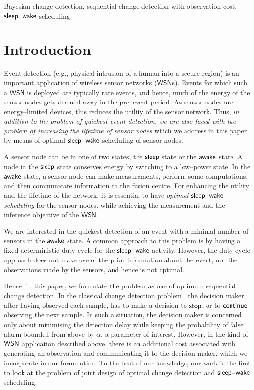 \documentclass[journal]{IEEEtran}
\newcommand{\sleep}{{${\sf sleep }$}}
\newcommand{\wake}{{${\sf awake }$}}
\newcommand{\wsn}{$\mathsf{WSN}$}
\begin{document}
\begin{IEEEkeywords}
Bayesian change detection, sequential change detection with observation
cost, \sleep--${\sf wake}$ scheduling 
\end{IEEEkeywords}


\IEEEpeerreviewmaketitle


\section{Introduction}
\label{sec:introduction}
Event detection (e.g., physical intrusion of a human into a secure
region) is an important application of wireless sensor networks
({\wsn}s). Events for which such a {\wsn} is deployed are typically rare
events, and hence, much of the energy of the sensor nodes gets drained
away in the pre--event period. As sensor nodes are energy--limited
devices, this reduces the utility of the sensor network.  Thus, {\em in
addition to the problem of quickest event detection, we are also faced
with the problem of increasing the lifetime of sensor nodes} which we
address in this paper by means of optimal \sleep--${\sf wake}$
scheduling of sensor nodes.

A sensor node can be in one of two states, the {\sleep} state or the
{\wake} state. A node in the {\sleep} state conserves energy by
switching to a low--power state. In the {\wake} state, a sensor node can
make measurements, perform some computations, and then communicate
information to the fusion centre. For enhancing the utility and the
lifetime of the network, it is essential to have {\em optimal
\sleep--${\sf wake}$ scheduling} for the sensor nodes, while achieving
the measurement and the inference objective of the \wsn.

We are interested in the quickest detection of an event with a minimal
number of sensors in the {\wake} state. A common approach to this
problem is by having a fixed deterministic duty cycle for the
\sleep--${\sf wake}$ activity. However, the duty cycle approach does not
make use of the prior information about the event, nor the observations
made by the sensors, and hence is not optimal. 

Hence, in this paper, we formulate the problem as one of optimum
sequential change detection.  In the classical change detection problem
\cite{shiryayev63}, the decision maker after having observed each
sample, has to make a decision to ${\sf stop}$, or to ${\sf continue}$
observing the next sample. In such a situation, the decision maker is
concerned only about minimising the detection delay while keeping the
probability of false alarm bounded from above by $\alpha$, a parameter
of interest. However, in the kind of ${\sf WSN}$ application described
above, there is an additional cost associated with generating an
observation and communicating it to the decision maker, which we
incorporate in our formulation. To the best of our knowledge, our work
is the first to look at the problem of joint design of optimal change
detection and \sleep--${\sf wake}$ scheduling.
\end{document}
